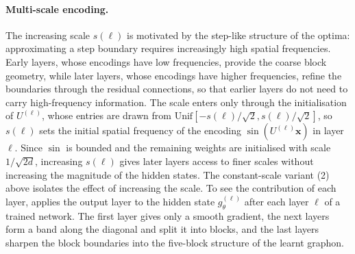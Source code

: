 \documentclass[11pt]{article}
\theoremstyle{plain}
\theoremstyle{definition}
\theoremstyle{remark}
\begin{document}
\paragraph{Multi-scale encoding.}
The increasing scale $s(\ell)$ is motivated by the step-like structure of the optima: approximating a step boundary requires increasingly high spatial frequencies. Early layers, whose encodings have low frequencies, provide the coarse block geometry, while later layers, whose encodings have higher frequencies, refine the boundaries through the residual connections, so that earlier layers do not need to carry high-frequency information. The scale enters only through the initialisation of $U^{(\ell)}$, whose entries are drawn from $\mathrm{Unif}[-s(\ell)/\sqrt{2}, s(\ell)/\sqrt{2}]$, so $s(\ell)$ sets the initial spatial frequency of the encoding $\sin(U^{(\ell)}\mathbf{x})$ in layer $\ell$. Since $\sin$ is bounded and the remaining weights are initialised with scale $1/\sqrt{2d}$, increasing $s(\ell)$ gives later layers access to finer scales without increasing the magnitude of the hidden states. The constant-scale variant (2) above isolates the effect of increasing the scale. To see the contribution of each layer,  applies the output layer to the hidden state $g^{(\ell)}_\theta$ after each layer $\ell$ of a trained network. The first layer gives only a smooth gradient, the next layers form a band along the diagonal and split it into blocks, and the last layers sharpen the block boundaries into the five-block structure of the learnt graphon.
\end{document}
